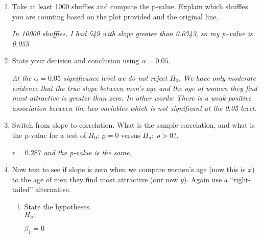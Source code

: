 \begin{enumerate}
\begin{key}
  {\it AWV.  generally flatter}
\end{key}

\item  Take at least 1000 shuffles and compute the p-value.  Explain
  which shuffles you are counting based on the plot provided and 
  the original line.
\begin{students}
 \vspace{2cm}      
\end{students}

\begin{key}
  {\it In 10000 shuffles, I had 549 with slope greater than 0.0343, so
  my p--value is 0.055}
\end{key}

\item State your decision and conclusion using $\alpha = 0.05$.
\begin{students}
 \vspace{2cm}      
\end{students}

\begin{key}
  {\it At the $\alpha = 0.05$ significance level we do not reject
    $H_0$, We have only moderate evidence that the true slope between
    men's age and the age of woman they find most attractive is
    greater than zero.  In other words: There is a weak positive
    association between the two variables which is not significant at
    the 0.05 level.}
\end{key}

\item Switch from slope to correlation. What is the sample
  correlation, and what is the p-value for a test of $H_0:\ \rho=0$
  versus $H_a:\ \rho > 0$?.
\begin{students}
 \vspace{1cm}      
\end{students}

\begin{key}
{\it $r = 0.287$ and the p-value is the same.}
\end{key}

\item Now test to see if slope is zero when we compare women's age
  (now this is $x$) to the age of men they find most attractive (our
  new $y$). Again use a ``right-tailed'' alternative.  
  \begin{enumerate}
  \item State the hypotheses.\\
  $H_o:$
\begin{students}
 \vspace{1cm}      
\end{students}
\begin{key}
  {\it  $\beta_1 = 0$   }
\end{key}


\end{enumerate}
\end{enumerate}
